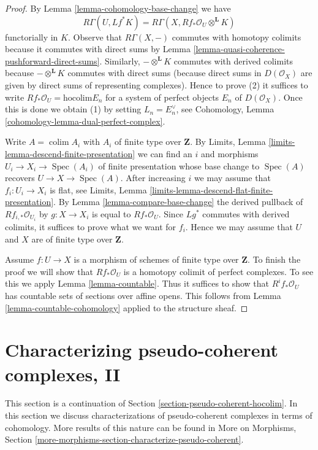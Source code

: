 \documentclass{stacks-project}
\theoremstyle{plain}
\theoremstyle{definition}
\theoremstyle{remark}
\numberwithin{equation}{subsection}
\def\colim{\mathop{\mathrm{colim}}\nolimits}
\def\Spec{\mathop{\mathrm{Spec}}}
\begin{document}
\begin{proof}
By Lemma \ref{lemma-cohomology-base-change} we have
$$
R\Gamma(U, Lf^*K) = R\Gamma(X, Rf_*\mathcal{O}_U \otimes^\mathbf{L} K)
$$
functorially in $K$. Observe that $R\Gamma(X, -)$ commutes with
homotopy colimits because it commutes with direct sums by
Lemma \ref{lemma-quasi-coherence-pushforward-direct-sums}.
Similarly, $- \otimes^\mathbf{L} K$ commutes with derived colimits
because $- \otimes^\mathbf{L} K$ commutes with direct sums
(because direct sums in $D(\mathcal{O}_X)$
are given by direct sums of representing complexes).
Hence to prove (2) it suffices to write
$Rf_*\mathcal{O}_U = \text{hocolim} E_n$ for a system of
perfect objects $E_n$ of $D(\mathcal{O}_X)$. Once this is done
we obtain (1) by setting $L_n = E_n^\vee$, see
Cohomology, Lemma \ref{cohomology-lemma-dual-perfect-complex}.

\medskip\noindent
Write $A = \colim A_i$ with $A_i$ of finite type over $\mathbf{Z}$.
By Limits, Lemma \ref{limits-lemma-descend-finite-presentation}
we can find an $i$ and morphisms $U_i \to X_i \to \Spec(A_i)$
of finite presentation whose base change to $\Spec(A)$ recovers
$U \to X \to \Spec(A)$.
After increasing $i$ we may assume that $f_i : U_i \to X_i$ is
flat, see Limits, Lemma \ref{limits-lemma-descend-flat-finite-presentation}.
By Lemma \ref{lemma-compare-base-change}
the derived pullback of $Rf_{i, *}\mathcal{O}_{U_i}$
by $g : X \to X_i$ is equal to $Rf_*\mathcal{O}_U$.
Since $Lg^*$ commutes with derived colimits, it suffices
to prove what we want for $f_i$. Hence we may assume that
$U$ and $X$ are of finite type over $\mathbf{Z}$.

\medskip\noindent
Assume $f : U \to X$ is a morphism of schemes of finite type over $\mathbf{Z}$.
To finish the proof we will show that $Rf_*\mathcal{O}_U$ is a homotopy
colimit of perfect complexes. To see this we apply Lemma \ref{lemma-countable}.
Thus it suffices to show that $R^if_*\mathcal{O}_U$
has countable sets of sections over affine opens.
This follows from Lemma \ref{lemma-countable-cohomology}
applied to the structure sheaf.
\end{proof}




\section{Characterizing pseudo-coherent complexes, II}
\label{section-pseudo-coherent}

\noindent
This section is a continuation of
Section \ref{section-pseudo-coherent-hocolim}.
In this section we discuss characterizations of pseudo-coherent complexes
in terms of cohomology. More results of this nature can be found in
More on Morphisms, Section
\ref{more-morphisms-section-characterize-pseudo-coherent}.
\end{document}
